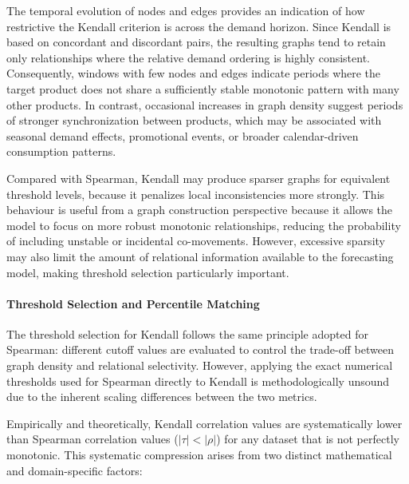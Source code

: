 The temporal evolution of nodes and edges provides an indication of how restrictive the Kendall criterion is across the demand horizon. Since Kendall is based on concordant and discordant pairs, the resulting graphs tend to retain only relationships where the relative demand ordering is highly consistent. Consequently, windows with few nodes and edges indicate periods where the target product does not share a sufficiently stable monotonic pattern with many other products. In contrast, occasional increases in graph density suggest periods of stronger synchronization between products, which may be associated with seasonal demand effects, promotional events, or broader calendar-driven consumption patterns.


Compared with Spearman, Kendall may produce sparser graphs for equivalent threshold levels, because it penalizes local inconsistencies more strongly. This behaviour is useful from a graph construction perspective because it allows the model to focus on more robust monotonic relationships, reducing the probability of including unstable or incidental co-movements. However, excessive sparsity may also limit the amount of relational information available to the forecasting model, making threshold selection particularly important.

\paragraph{Threshold Selection and Percentile Matching}

The threshold selection for Kendall follows the same principle adopted for Spearman: different cutoff values are evaluated to control the trade-off between graph density and relational selectivity. However, applying the exact numerical thresholds used for Spearman directly to Kendall is methodologically unsound due to the inherent scaling differences between the two metrics. 

Empirically and theoretically, Kendall correlation values are systematically lower than Spearman correlation values ($|\tau| < |\rho|$) for any dataset that is not perfectly monotonic. This systematic compression arises from two distinct mathematical and domain-specific factors:

